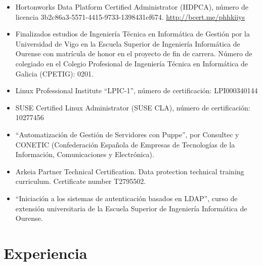 \documentclass[spanish]{simplecv}
\begin{document}
\begin{itemize}
\item Hortonworks Data Platform Certified Administrator (HDPCA), número de licencia 3b2c86a3-5571-4415-9733-1398431ef674.\newline
\url{http://bcert.me/phhkiiys}
\item Finalizados estudios de Ingeniería Técnica en Informática
de Gestión por la Universidad de Vigo en la Escuela Superior de Ingeniería
Informática de Ourense con matrícula de honor en el proyecto de fin de carrera.\newline
Número de colegiado en el Colegio Profesional de Ingeniería Técnica en Informática de Galicia (CPETIG): 0201.
\item Linux Professional Institute “LPIC-1”, número de certificación: LPI000340144
\item SUSE Certified Linux Administrator (SUSE CLA), número de certificación: 10277456
\item ``Automatización de Gestión de Servidores con Puppe'', por Consultec y CONETIC (Confederación Española de Empresas de Tecnologías de la Información, Comunicaciones y Electrónica).
\item Arkeia Partner Technical Certification. Data protection technical training curriculum. Certificate number T2795502.
\item {}``Iniciación a los sistemas de autenticación basados en LDAP'',
curso de extensión universitaria de la Escuela Superior de Ingeniería
Informática de Ourense.
\end{itemize}

\section{Experiencia}
\end{document}
